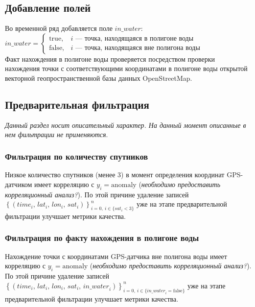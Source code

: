 \documentclass[a4paper,12pt]{report}
\begin{document}
	\subsection*{Добавление полей}
	Во временной ряд добавляется поле $in\_water$:\\
	$in\_water  =
	\begin{cases}
		\mathrm{true},   & \text{$i$ --- точка, находящаяся в полигоне воды}\\
		\mathrm{false}, & \text{$i$ --- точка, находящаяся вне полигона воды}
	\end{cases}$\\
	Факт нахождения в полигоне воды проверяется посредством проверки нахождения точки с соответствующими координатами в полигоне воды открытой векторной геопространственной базы данных OpenStreetMap.

	\subsection*{Предварительная фильтрация}
	\textit{Данный раздел носит описательный характер. На данный момент описанные в нем фильтрации не применяются}.
	\subsubsection*{Фильтрация по количеству спутников}
	Низкое количество спутников (менее 3) в момент определения координат GPS-датчиком имеет корреляцию с $y_i = \mathrm{anomaly}$ (\textit{необходимо предоставить корреляционный анализ?}). По этой причине удаление записей $\left\{\left(\mathit{time}_i,\, \mathit{lat}_i,\, \mathit{lon}_i,\, \mathit{sat}_i\right) \right\}_{i=0,\ i \in \{sat_i < 3\}}^{n}$ уже на этапе предварительной фильтрации улучшает метрики качества.

	\subsubsection*{Фильтрация по факту нахождения в полигоне воды}
	Нахождение точки с координатами GPS-датчика вне полигона воды имеет корреляцию с $y_i = \mathrm{anomaly}$ (\textit{необходимо предоставить корреляционный анализ?}). По этой причине удаление записей \\ $\left\{\left(\mathit{time}_i,\, \mathit{lat}_i,\, \mathit{lon}_i,\, \mathit{sat}_i,\, \mathit{in\_water}_i\right) \right\}_{i=0,\ i \in \{\mathit{in\_water}_i = \mathrm{false}\}}^{n}$ уже на этапе предварительной фильтрации улучшает метрики качества.
\end{document}
